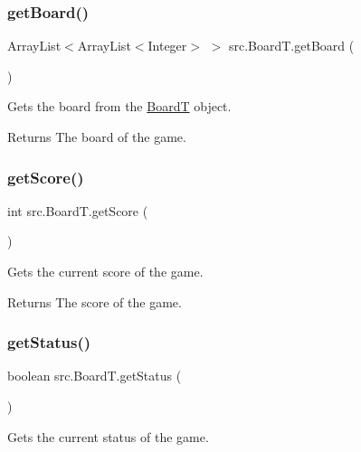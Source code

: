 \subsubsection{\texorpdfstring{get\+Board()}{getBoard()}}
{\footnotesize\ttfamily Array\+List$<$Array\+List$<$Integer$>$ $>$ src.\+Board\+T.\+get\+Board (\begin{DoxyParamCaption}{ }\end{DoxyParamCaption})}



Gets the board from the \hyperlink{classsrc_1_1BoardT}{BoardT} object. 

\begin{DoxyReturn}{Returns}
The board of the game. 
\end{DoxyReturn}
\mbox{\label{classsrc_1_1BoardT_a540ee9b96f179d4f4a4be563b6d31566}} 
\subsubsection{\texorpdfstring{get\+Score()}{getScore()}}
{\footnotesize\ttfamily int src.\+Board\+T.\+get\+Score (\begin{DoxyParamCaption}{ }\end{DoxyParamCaption})}



Gets the current score of the game. 

\begin{DoxyReturn}{Returns}
The score of the game. 
\end{DoxyReturn}
\mbox{\label{classsrc_1_1BoardT_a22b1a380928d8aff4d0026d73a421515}} 
\subsubsection{\texorpdfstring{get\+Status()}{getStatus()}}
{\footnotesize\ttfamily boolean src.\+Board\+T.\+get\+Status (\begin{DoxyParamCaption}{ }\end{DoxyParamCaption})}



Gets the current status of the game. 

